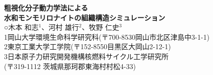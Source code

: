 ﻿\documentclass[11pt,a4j]{jarticle}
\newlength{\minitwocolumn}
\begin{document}
\newcommand{\fat}[1]{\mbox{\boldmath $#1$}}
\newcommand{\D}{\partial}
\newcommand{\w}{\omega}
\newcommand{\ga}{\alpha}
\newcommand{\gb}{\beta}
\newcommand{\gx}{\xi}
\newcommand{\gz}{\zeta}
\newcommand{\vhat}[1]{\hat{\fat{#1}}}
\newcommand{\spc}{\vspace{0.7\baselineskip}}
\newcommand{\halfspc}{\vspace{0.3\baselineskip}}

\newcommand{\twofig}[2]
 {
   \begin{figure}[h]
     \begin{minipage}[t]{\minitwocolumn}
         \begin{center}   #1
         \end{center}
     \end{minipage}
         \hspace{\columnsep}
     \begin{minipage}[t]{\minitwocolumn}
         \begin{center} #2
         \end{center}
     \end{minipage}
   \end{figure}
 }
\vspace{2mm}
\begin{center}
{\LARGE \bf 
粗視化分子動力学法による\\水和モンモリロナイトの組織構造シミュレーション\\
} 
 ○木本 和志$^1$、河村 雄行$^2$、牧野 仁史$^3$\\
1岡山大学環境生命科学研究科(〒700-8530岡山市北区津島中3-1-1)\\
2東京工業大学工学院(〒152-8550目黒区大岡山2-12-1)\\
3日本原子力研究開発機構核燃料サイクル工学研究所\\
(〒319-1112 茨城県那珂郡東海村村松4-33)
\end{center}
\end{document}

